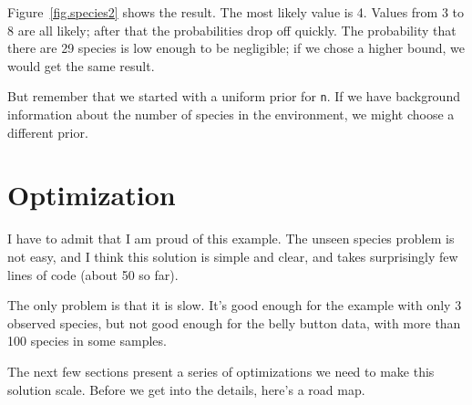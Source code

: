 \documentclass[12pt]{book}
\begin{document}
Figure~\ref{fig.species2} shows the result.  The most likely value is 4.
Values from 3 to 8 are all likely; after that the probabilities
drop off quickly.  The probability that there are 29 species is
low enough to be negligible; if we chose a higher bound, 
we would get the same result.

But remember that we started with a uniform prior for {\tt n}.  If we
have background information about the number of species in the
environment, we might choose a different prior.


\section{Optimization}

I have to admit that I am proud of this example.  The unseen species
problem is not easy, and I think this solution is simple and clear,
and takes surprisingly few lines of code (about 50 so far).

The only problem is that it is slow.  It's good enough for the example
with only 3 observed species, but not good enough for the belly button
data, with more than 100 species in some samples.

The next few sections present a series of optimizations we need to
make this solution scale.  Before we get into the details, here's
a road map.
\end{document}
